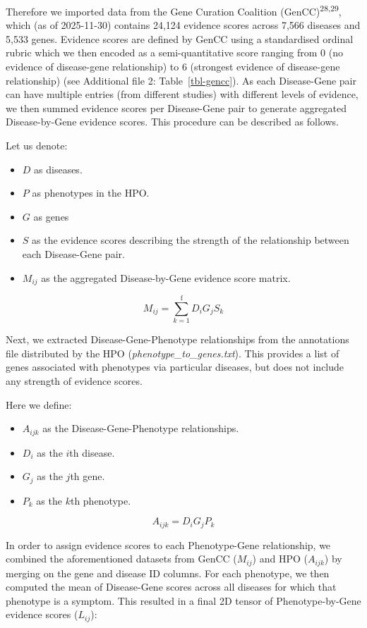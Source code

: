 \documentclass[
]{article}
\begin{document}
Therefore we imported data from the Gene Curation Coalition
(GenCC)\textsuperscript{28,29}, which (as of 2025-11-30) contains 24,124
evidence scores across 7,566 diseases and 5,533 genes. Evidence scores
are defined by GenCC using a standardised ordinal rubric which we then
encoded as a semi-quantitative score ranging from 0 (no evidence of
disease-gene relationship) to 6 (strongest evidence of disease-gene
relationship) (see Additional file 2: Table~\ref{tbl-gencc}). As each
Disease-Gene pair can have multiple entries (from different studies)
with different levels of evidence, we then summed evidence scores per
Disease-Gene pair to generate aggregated Disease-by-Gene evidence
scores. This procedure can be described as follows.

Let us denote:

\begin{itemize}
\item
  \(D\) as diseases.
\item
  \(P\) as phenotypes in the HPO.
\item
  \(G\) as genes
\item
  \(S\) as the evidence scores describing the strength of the
  relationship between each Disease-Gene pair.
\item
  \(M_{ij}\) as the aggregated Disease-by-Gene evidence score matrix.
\end{itemize}

\[
M_{ij} = \sum_{k=1}^{\text{f}} D_i G_j S_k
\]

Next, we extracted Disease-Gene-Phenotype relationships from the
annotations file distributed by the HPO
(\emph{phenotype\_to\_genes.txt}). This provides a list of genes
associated with phenotypes via particular diseases, but does not include
any strength of evidence scores.

Here we define:

\begin{itemize}
\item
  \(A_{ijk}\) as the Disease-Gene-Phenotype relationships.
\item
  \(D_i\) as the \(i\)th disease.
\item
  \(G_j\) as the \(j\)th gene.
\item
  \(P_k\) as the \(k\)th phenotype.
\end{itemize}

\[
A_{ijk} = D_i G_j P_k
\]

In order to assign evidence scores to each Phenotype-Gene relationship,
we combined the aforementioned datasets from GenCC (\(M_{ij}\)) and HPO
(\(A_{ijk}\)) by merging on the gene and disease ID columns. For each
phenotype, we then computed the mean of Disease-Gene scores across all
diseases for which that phenotype is a symptom. This resulted in a final
2D tensor of Phenotype-by-Gene evidence scores (\(L_{ij}\)):
\end{document}
